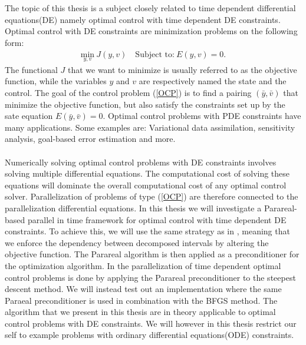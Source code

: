 \\
\\
The topic of this thesis is a subject closely related to time dependent differential equations(DE) namely optimal control with time dependent DE constraints. Optimal control with DE constraints are minimization problems on the following form:
\begin{align}
\underset{y,v}{\text{min}} \ J(y,v) \quad \textrm{Subject to:} \ E(y,v)=0. \label{OCP}
\end{align}
The functional $J$ that we want to minimize is usually referred to as the objective function, while the variables $y$ and $v$ are respectively named the state and the control. The goal of the control problem (\ref{OCP}) is to find a pairing $(\bar y,\bar v)$ that minimize the objective function, but also satisfy the constraints set up by the sate equation $ E(\bar y,\bar v)=0$. Optimal control problems with PDE constraints have many applications. Some examples are: Variational data assimilation, sensitivity analysis, goal-based error estimation and more.
\\
\\
Numerically solving optimal control problems with DE constraints involves solving multiple differential equations. The computational cost of solving these equations will dominate the overall computational cost of any optimal control solver. Parallelization of problems of type (\ref{OCP}) are therefore connected to the parallelization differential equations. In this thesis we will investigate a Parareal-based parallel in time framework for optimal control with time dependent DE constraints. To achieve this, we will use the same strategy as in \cite{maday2002parareal}, meaning that we enforce the dependency between decomposed intervals by altering the objective function. The Parareal algorithm is then applied as a preconditioner for the optimization algorithm. In \cite{maday2002parareal} the parallelization of time dependent optimal control problems is done by applying the Parareal preconditioner to the steepest descent method. We will instead test out an implementation where the same Paraeal preconditioner is used in combination with the BFGS method. The algorithm that we present in this thesis are in theory applicable to optimal control problems with DE constraints. We will however in this thesis restrict our self to example problems with ordinary differential equations(ODE) constraints.

